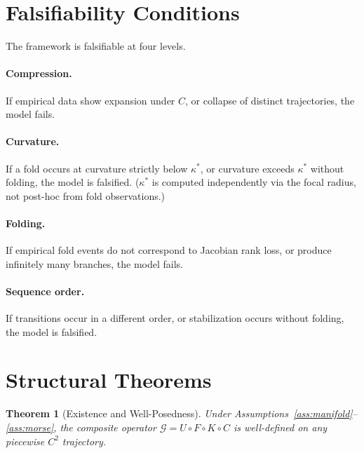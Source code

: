 \documentclass[12pt, oneside]{book}
\theoremstyle{plain}
\newtheorem{theorem}{Theorem}[section]
\theoremstyle{definition}
\theoremstyle{remark}
\begin{document}
\section{Falsifiability Conditions}

The framework is falsifiable at four levels.

\paragraph{Compression.}
If empirical data show expansion under $C$, or collapse of distinct
trajectories, the model fails.

\paragraph{Curvature.}
If a fold occurs at curvature strictly below $\kappa^*$, or curvature
exceeds $\kappa^*$ without folding, the model is falsified. ($\kappa^*$
is computed independently via the focal radius, not post-hoc from fold
observations.)

\paragraph{Folding.}
If empirical fold events do not correspond to Jacobian rank loss, or
produce infinitely many branches, the model fails.

\paragraph{Sequence order.}
If transitions occur in a different order, or stabilization occurs
without folding, the model is falsified.

\section{Structural Theorems}

\begin{theorem}[Existence and Well-Posedness]
Under Assumptions~\ref{ass:manifold}--\ref{ass:morse}, the composite
operator $\mathcal{G} = U \circ F \circ K \circ C$ is well-defined on
any piecewise $C^2$ trajectory.
\end{theorem}
\end{document}
